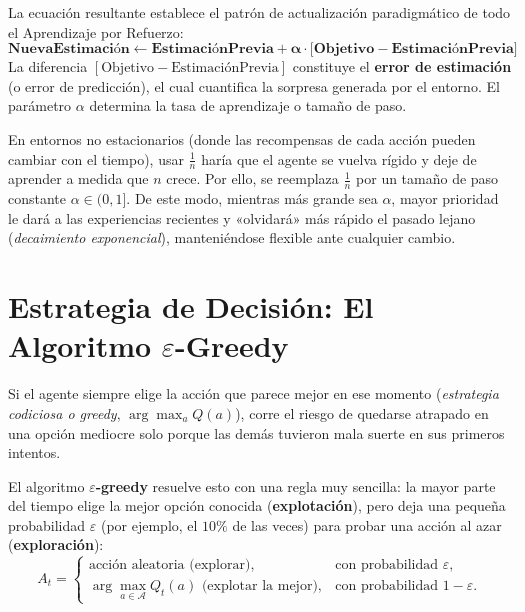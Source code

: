 \begin{ideaclave}
La ecuación resultante establece el patrón de actualización paradigmático de todo el Aprendizaje por Refuerzo:
\begin{equation}
  \mathbf{\text{NuevaEstimación} \leftarrow \text{EstimaciónPrevia} + \alpha \cdot \Big[ \text{Objetivo} - \text{EstimaciónPrevia} \Big]}
\end{equation}
La diferencia $[\text{Objetivo} - \text{EstimaciónPrevia}]$ constituye el \textbf{error de estimación} (o error de predicción), el cual cuantifica la sorpresa generada por el entorno. El parámetro $\alpha$ determina la tasa de aprendizaje o tamaño de paso.
\end{ideaclave}

En entornos no estacionarios (donde las recompensas de cada acción pueden cambiar con el tiempo), usar $\frac{1}{n}$ haría que el agente se vuelva rígido y deje de aprender a medida que $n$ crece. Por ello, se reemplaza $\frac{1}{n}$ por un tamaño de paso constante $\alpha \in (0, 1]$. De este modo, mientras más grande sea $\alpha$, mayor prioridad le dará a las experiencias recientes y «olvidará» más rápido el pasado lejano (\textit{decaimiento exponencial}), manteniéndose flexible ante cualquier cambio.


\section{Estrategia de Decisión: El Algoritmo $\varepsilon$-Greedy}
Si el agente siempre elige la acción que parece mejor en ese momento (\textit{estrategia codiciosa o greedy}, $\arg\max_a Q(a)$), corre el riesgo de quedarse atrapado en una opción mediocre solo porque las demás tuvieron mala suerte en sus primeros intentos.

El algoritmo \textbf{$\varepsilon$-greedy} resuelve esto con una regla muy sencilla: la mayor parte del tiempo elige la mejor opción conocida (\textbf{explotación}), pero deja una pequeña probabilidad $\varepsilon$ (por ejemplo, el $10\%$ de las veces) para probar una acción al azar (\textbf{exploración}):
\begin{equation}
  A_t = \begin{cases}
    \text{acción aleatoria (explorar)}, & \text{con probabilidad } \varepsilon, \\
    \arg\max_{a \in \mathcal{A}} Q_t(a) \text{ (explotar la mejor)}, & \text{con probabilidad } 1 - \varepsilon.
  \end{cases}
\end{equation}

